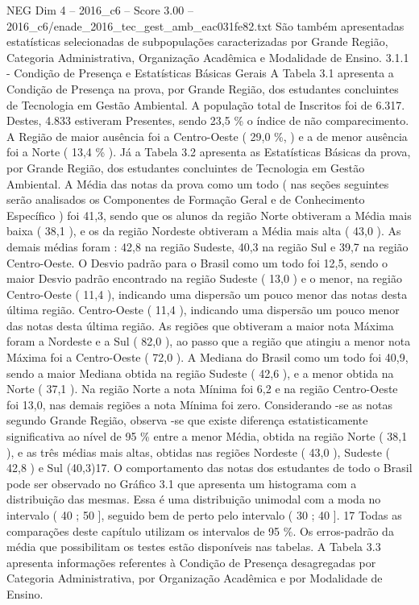 \begin{textsample}{NEG Dim 4 – 2016\_c6 – Score 3.00 – 2016\_c6/enade\_2016\_tec\_gest\_amb\_eac031fe82.txt}
São também apresentadas estatísticas selecionadas de subpopulações caracterizadas por Grande Região, Categoria Administrativa, Organização Acadêmica e Modalidade de Ensino. 3.1.1 - Condição de Presença e Estatísticas Básicas Gerais A Tabela 3.1 apresenta a Condição de Presença na prova, por Grande Região, dos estudantes concluintes de Tecnologia em Gestão Ambiental.
A população total de Inscritos foi de 6.317.
Destes, 4.833 estiveram Presentes, sendo 23,5 \% o índice de não comparecimento.
A Região de maior ausência foi a Centro-Oeste ( 29,0 \%, ) e a de menor ausência foi a Norte ( 13,4 \% ).
Já a Tabela 3.2 apresenta as Estatísticas Básicas da prova, por Grande Região, dos estudantes concluintes de Tecnologia em Gestão Ambiental.
A Média das notas da prova como um todo ( nas seções seguintes serão analisados os Componentes de Formação Geral e de Conhecimento Específico ) foi 41,3, sendo que os alunos da região Norte obtiveram a Média mais baixa ( 38,1 ), e os da região Nordeste obtiveram a Média mais alta ( 43,0 ).
As demais médias foram : 42,8 na região Sudeste, 40,3 na região Sul e 39,7 na região Centro-Oeste.
O Desvio padrão para o Brasil como um todo foi 12,5, sendo o maior Desvio padrão encontrado na região Sudeste ( 13,0 ) e o menor, na região Centro-Oeste ( 11,4 ), indicando uma dispersão um pouco menor das notas desta última região.
Centro-Oeste ( 11,4 ), indicando uma dispersão um pouco menor das notas desta última região.
As regiões que obtiveram a maior nota Máxima foram a Nordeste e a Sul ( 82,0 ), ao passo que a região que atingiu a menor nota Máxima foi a Centro-Oeste ( 72,0 ).
A Mediana do Brasil como um todo foi 40,9, sendo a maior Mediana obtida na região Sudeste ( 42,6 ), e a menor obtida na Norte ( 37,1 ).
Na região Norte a nota Mínima foi 6,2 e na região Centro-Oeste foi 13,0, nas demais regiões a nota Mínima foi zero.
Considerando -se as notas segundo Grande Região, observa -se que existe diferença estatisticamente significativa ao nível de 95 \% entre a menor Média, obtida na região Norte ( 38,1 ), e as três médias mais altas, obtidas nas regiões Nordeste ( 43,0 ), Sudeste ( 42,8 ) e Sul (40,3)17.
O comportamento das notas dos estudantes de todo o Brasil pode ser observado no Gráfico 3.1 que apresenta um histograma com a distribuição das mesmas.
Essa é uma distribuição unimodal com a moda no intervalo ( 40 ; 50 ], seguido bem de perto pelo intervalo ( 30 ; 40 ]. 17 Todas as comparações deste capítulo utilizam os intervalos de 95 \%.
Os erros-padrão da média que possibilitam os testes estão disponíveis nas tabelas.
A Tabela 3.3 apresenta informações referentes à Condição de Presença desagregadas por Categoria Administrativa, por Organização Acadêmica e por Modalidade de Ensino.

\end{textsample}
